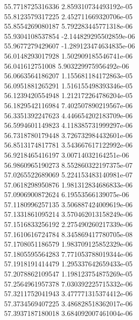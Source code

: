 {55.7718725316336 2.859310734493192e-05 \\
55.8123579317225 2.452711669320706e-05 \\
55.8554269080187 5.792283445771318e-06 \\
55.9304108537854 -2.144829295502859e-06 \\
55.9677279429607 -1.289123474634835e-06 \\
56.0148293017928 1.502909185546741e-06 \\
56.041612751008 5.903229975956492e-06 \\
56.0663564186207 1.155681184172863e-05 \\
56.0951881265291 1.516155498393346e-05 \\
56.1239420554948 1.212172264786204e-05 \\
56.1829542116984 7.402507890219567e-06 \\
56.3351392247623 4.446654202183709e-06 \\
56.5994601149823 4.118385731999297e-06 \\
56.7318780179448 3.726732984432601e-06 \\
56.8513174817781 3.543667617122992e-06 \\
56.9218465416197 3.00714032164251e-06 \\
56.9860965190273 8.552860322197375e-07 \\
57.0265522689069 5.224153483140981e-07 \\
57.0618298950876 1.981312834686833e-06 \\
57.0906900872624 6.19553566139075e-06 \\
57.1180996257135 3.506887424009619e-06 \\
57.1331861095214 3.570462013158249e-06 \\
57.1516833256192 2.275490260217339e-06 \\
57.1610616724784 8.345869417780705e-08 \\
57.1708051186579 1.983709125852329e-06 \\
57.1805595564283 7.771053788019344e-06 \\
57.1918191414479 1.295337642659433e-05 \\
57.2078862109547 1.198123754875269e-05 \\
57.2564961957378 7.030392225715332e-06 \\
57.3211752041943 3.477771315374412e-06 \\
57.3734569407225 3.486828518362017e-06 \\
57.3937187180018 3.684092007461004e-06 \\
}
